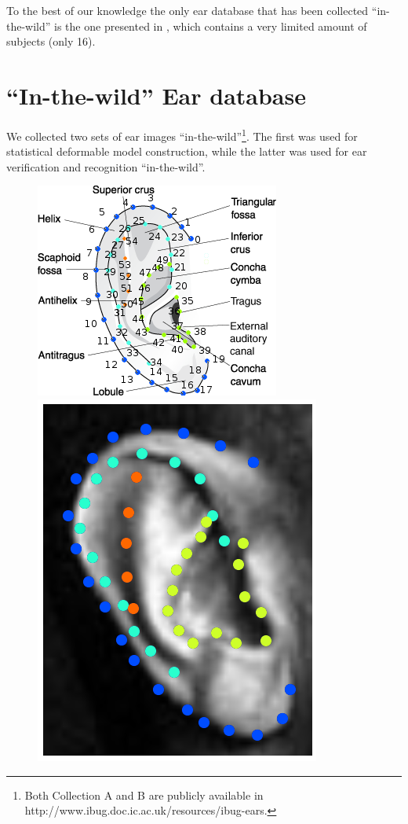 To the best of our knowledge the only ear database that has been collected ``in-the-wild'' is the one presented in \cite{emervsivc2015ear}, which contains a very limited amount of subjects (only 16).

\section{``In-the-wild'' Ear database}
\label{label:ear_db}
We collected two sets of ear images ``in-the-wild''\footnote{\label{foot:annotations}Both Collection A and B are publicly available in http://www.ibug.doc.ic.ac.uk/resources/ibug-ears.}. The first was used for  statistical deformable model construction, while the latter was used for ear verification and recognition ``in-the-wild''.

\begin{figure}[!b]
    \centering
    \includegraphics[width=0.9\columnwidth]{resources/Ear_Deformable_Model/pinna} \\
    \newcommand{\flowh}{0.22\columnwidth}
    \newcommand{\flowhhh}{0.21\columnwidth}
    \includegraphics[height=\flowh]{resources/Ear_Deformable_Model/dbs/db_1}

\end{figure}
